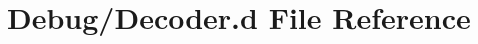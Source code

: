 \hypertarget{Debug_2Decoder_8d}{}\section{Debug/\+Decoder.d File Reference}
\label{Debug_2Decoder_8d}
